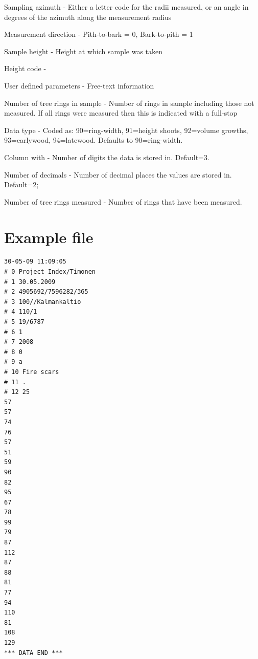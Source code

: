 \begin{description*}
 \item[Sampling azimuth] - Either a letter code for the radii measured, or an angle in degrees of the azimuth along the measurement radius
 \item[Measurement direction] - Pith-to-bark = 0, Bark-to-pith = 1
 \item[Sample height] - Height at which sample was taken
 \item[Height code] - 
 \item[User defined parameters] - Free-text information
 \item[Number of tree rings in sample] - Number of rings in sample including those not measured.  If all rings were measured then this is indicated with a full-stop
 \item[Data type] - Coded as: 90=ring-width, 91=height shoots, 92=volume growths, 93=earlywood, 94=latewood.  Defaults to 90=ring-width.
 \item[Column with] - Number of digits the data is stored in. Default=3.
 \item[Number of decimals] - Number of decimal places the values are stored in.  Default=2;
 \item[Number of tree rings measured] - Number of rings that have been measured.
\end{description*}

\newpage

\section{Example file}

\begin{lstlisting}
30-05-09 11:09:05
# 0 Project Index/Timonen
# 1 30.05.2009
# 2 4905692/7596282/365
# 3 100//Kalmankaltio
# 4 110/1
# 5 19/6787
# 6 1
# 7 2008
# 8 0
# 9 a
# 10 Fire scars
# 11 .
# 12 25
57
57
74
76
57
51
59
90
82
95
67
78
99
79
87
112
87
88
81
77
94
110
81
108
129
*** DATA END ***
\end{lstlisting}



